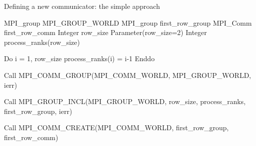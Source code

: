 \documentclass[aspectratio=43]{beamer}
\begin{document}
\begin{frame}[fragile]{Defining a new communicator: the simple approach}
\begin{Fortranlisting}[]{}
MPI_group MPI_GROUP_WORLD
MPI_group first_row_group
MPI_Comm first_row_comm
Integer row_size
Parameter(row_size=2)
Integer process_ranks(row_size)

Do i = 1, row_size
   process_ranks(i) = i-1
Enddo

Call MPI_COMM_GROUP(MPI_COMM_WORLD, MPI_GROUP_WORLD, ierr)

Call MPI_GROUP_INCL(MPI_GROUP_WORLD, row_size,
                    process_ranks, first_row_group, ierr)

Call MPI_COMM_CREATE(MPI_COMM_WORLD, first_row_group, first_row_comm)
\end{Fortranlisting}
\end{frame}
\end{document}
